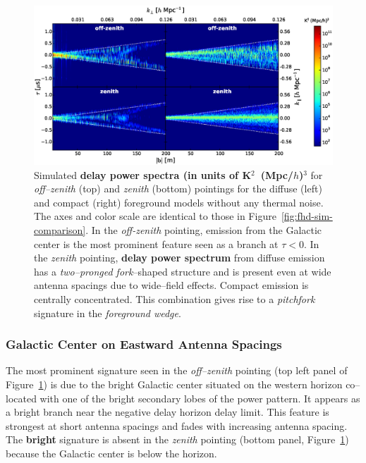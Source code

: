 \documentclass[preprint2,iop,numberedappendix]{emulateapj}
\begin{document}
\begin{figure}[htb]
\centering
\includegraphics[width=\linewidth]{figure8.eps}
\caption{Simulated {\bf delay power spectra (in units of K$^2$~(Mpc/$h$)$^3$} for {\it off--zenith} (top) and {\it zenith} (bottom) pointings for the diffuse (left) and compact (right) foreground models without any thermal noise. The axes and color scale are identical to those in Figure~\ref{fig:fhd-sim-comparison}. In the {\it off-zenith} pointing, emission from the Galactic center is the most prominent feature seen as a branch at $\tau<0$. In the {\it zenith} pointing, {\bf delay power spectrum} from diffuse emission has a {\it two--pronged fork}--shaped structure and is present even at wide antenna spacings due to wide--field effects. Compact emission is centrally concentrated. This combination gives rise to a {\it pitchfork} signature in the {\it foreground wedge}. \label{fig:noiseless-dsm-csm-delay-spectrum}}
\end{figure}

\subsubsection{Galactic Center on Eastward Antenna Spacings}\label{sec:GC-east}

The most prominent signature seen in the {\it off--zenith} pointing (top left panel of Figure~\ref{fig:noiseless-dsm-csm-delay-spectrum}) is due to the bright Galactic center situated on the western horizon co--located with one of the bright secondary lobes of the power pattern. It appears as a bright branch near the negative delay horizon delay limit. This feature is strongest at short antenna spacings and fades with increasing antenna spacing. The {\bf bright} signature is absent in the {\it zenith} pointing (bottom panel, Figure~\ref{fig:noiseless-dsm-csm-delay-spectrum}) because the Galactic center is below the horizon. 
\end{document}
